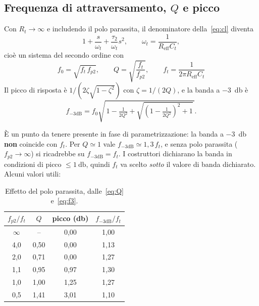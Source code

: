 \documentclass[11pt,a4paper]{article}
\begin{document}
\subsection{Frequenza di attraversamento, \texorpdfstring{$Q$}{Q} e picco}

Con $R_t\to\infty$ e includendo il polo parassita, il denominatore
della~\eqref{eq:cl} diventa
\begin{equation}
  1 + \frac{s}{\omega_t} + \frac{\tau_2}{\omega_t}s^{2},
  \qquad
  \omega_t = \frac{1}{R_{\mathrm{eff}} C_t},
\end{equation}
cioè un sistema del secondo ordine con
\begin{equation}
  \boxed{\;
  f_0 = \sqrt{f_t\,f_{p2}},
  \qquad
  Q = \sqrt{\frac{f_t}{f_{p2}}},
  \qquad
  f_t = \frac{1}{2\pi R_{\mathrm{eff}} C_t}\;}
  \label{eq:Q}
\end{equation}
Il picco di risposta è $1/\left(2\zeta\sqrt{1-\zeta^{2}}\right)$ con
$\zeta=1/(2Q)$, e la banda a \SI{-3}{\decibel} è
\begin{equation}
  f_{-3\mathrm{dB}} = f_0\sqrt{\,1-\tfrac{1}{2Q^{2}} + \sqrt{\left(1-\tfrac{1}{2Q^{2}}\right)^{2}+1}\,}.
  \label{eq:f3}
\end{equation}

È un punto da tenere presente in fase di parametrizzazione: la banda a
\SI{-3}{\decibel} \textbf{non} coincide con $f_t$. Per $Q\simeq 1$ vale
$f_{-3\mathrm{dB}}\simeq 1{,}3\,f_t$, e senza polo parassita
($f_{p2}\to\infty$) si ricadrebbe su $f_{-3\mathrm{dB}}=f_t$. I costruttori
dichiarano la banda in condizioni di picco $\le\SI{1}{\decibel}$, quindi
$f_t$ va scelto \emph{sotto} il valore di banda dichiarato. Alcuni valori
utili:

\begin{table}[h]
\centering
\begin{tabular}{cccc}
\toprule
$f_{p2}/f_t$ & $Q$ & picco (\si{\decibel}) & $f_{-3\mathrm{dB}}/f_t$ \\
\midrule
$\infty$ & --    & 0{,}00 & 1{,}00 \\
4{,}0    & 0{,}50 & 0{,}00 & 1{,}13 \\
2{,}0    & 0{,}71 & 0{,}00 & 1{,}27 \\
1{,}1    & 0{,}95 & 0{,}97 & 1{,}30 \\
1{,}0    & 1{,}00 & 1{,}25 & 1{,}27 \\
0{,}5    & 1{,}41 & 3{,}01 & 1{,}10 \\
\bottomrule
\end{tabular}
\caption{Effetto del polo parassita, dalle~\eqref{eq:Q} e~\eqref{eq:f3}.}
\end{table}
\end{document}
